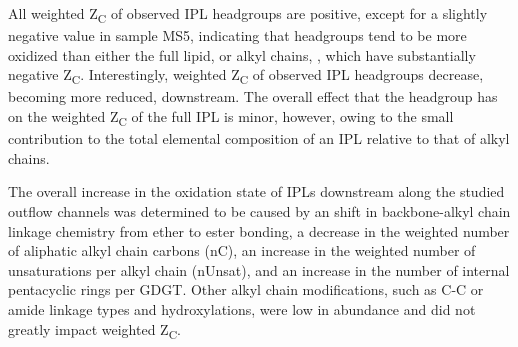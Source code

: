All weighted Z\textsubscript{C} of observed IPL headgroups are positive, except for a slightly negative value in sample MS5, indicating that headgroups tend to be more oxidized than either the full lipid, or alkyl chains, , which have substantially negative Z\textsubscript{C}.
Interestingly, weighted Z\textsubscript{C} of observed IPL headgroups decrease, becoming more reduced, downstream. The overall effect that the headgroup has on the weighted Z\textsubscript{C} of the full IPL is minor, however, owing to the small contribution to the total elemental composition of an IPL relative to that of alkyl chains.

The overall increase in the oxidation state of IPLs downstream along the studied outflow channels was determined to be caused by an shift in backbone-alkyl chain linkage chemistry from ether to ester bonding, a decrease in the weighted number of aliphatic alkyl chain carbons (nC), an increase in the weighted number of unsaturations per alkyl chain (nUnsat), and an increase in the number of internal pentacyclic rings per GDGT. Other alkyl chain modifications, such as C-C or amide linkage types and hydroxylations, were low in abundance and did not greatly impact weighted Z\textsubscript{C}.





